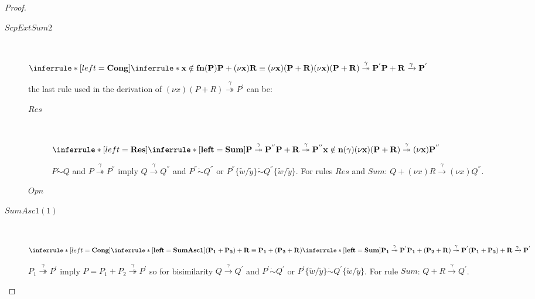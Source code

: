 \begin{proposition}
\begin{proof}
\begin{description}
\begin{description}
	      \item[$ScpExtSum2$]\hfill \\
		\begin{center}
		  $\inferrule* [left=\bf{Cong}]{
		      \inferrule* {
			x \notin fn(P)
		      }{
			P+(\nu x)R\equiv (\nu x)(P+R)
		      }
		    \\
		      (\nu x)(P+R) \stackrel{\gamma}{\twoheadrightarrow} P^{'}
		  }{
		    P+R \xrightarrow{\gamma} P^{'}
		  }$
		\end{center}
		the last rule used in the derivation of $(\nu x)(P+R) \stackrel{\gamma}{\twoheadrightarrow} P^{'}$ can be:
		\begin{description}
		  \item[$Res$]\hfill \\ 
		    \begin{center}
		      $\inferrule* [left=\bf{Res}]{
			  \inferrule* [left=\bf{Sum}]{
			    P \stackrel{\gamma}{\twoheadrightarrow} P^{''}
			  }{
			    P+R \stackrel{\gamma}{\twoheadrightarrow} P^{''}
			  }
			\\
			  x\notin n(\gamma)
		      }{
			(\nu x)(P+R) \stackrel{\gamma}{\twoheadrightarrow} (\nu x)P^{''}
		      }$
		    \end{center}
		    $P \dot{\sim} Q$ and $P \stackrel{\gamma}{\twoheadrightarrow} P^{''}$ imply $Q \xrightarrow{\gamma} Q^{''}$ and $P^{''} \dot{\sim} Q^{''}$ or $P^{''}\{\tilde{w}/\tilde{y}\} \dot{\sim} Q^{''}\{\tilde{w}/\tilde{y}\}$. For rules $Res$ and $Sum$: $Q+(\nu x)R \xrightarrow{\gamma} (\nu x)Q^{''}$.
		  \item[$Opn$]
		\end{description}
	      \item[$SumAsc1(1)$]\hfill \\
		\begin{center}
		  $\inferrule* [left=\bf{Cong}]{
		      \inferrule* [left=\bf{SumAsc1}] {
		      }{
			(P_{1}+P_{2})+R \equiv P_{1}+(P_{2}+R)
		      }
		    \\
		      \inferrule* [left=\bf{Sum}] {
			P_{1} \stackrel{\gamma}{\twoheadrightarrow} P^{'}
		      }{
			P_{1}+(P_{2}+R) \stackrel{\gamma}{\twoheadrightarrow} P^{'}
		      }
		  }{
		    (P_{1}+P_{2})+R \xrightarrow{\gamma} P^{'}
		  }$
		\end{center}
		$P_{1} \stackrel{\gamma}{\twoheadrightarrow} P^{'}$ imply $P=P_{1}+P_{2} \stackrel{\gamma}{\twoheadrightarrow} P^{'}$ so for bisimilarity $Q \xrightarrow{\gamma} Q^{'}$ and $P^{'}\dot{\sim} Q^{'}$ or $P^{'}\{\tilde{w}/\tilde{y}\} \dot{\sim} Q^{'}\{\tilde{w}/\tilde{y}\}$. For rule $Sum$: $Q+R \xrightarrow{\gamma} Q^{'}$.

\end{description}
\end{description}
\end{proof}
\end{proposition}
